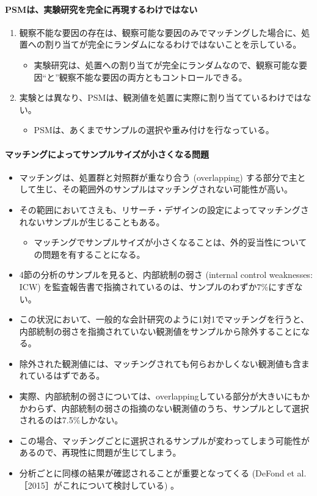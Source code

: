 \paragraph{PSMは、実験研究を完全に再現するわけではない}

\begin{enumerate}
 \item 観察不能な要因の存在は、観察可能な要因のみでマッチングした場合に、処置への割り当てが完全にランダムになるわけではないことを示している。
       \begin{itemize}
        \item 実験研究は、処置への割り当てが完全にランダムなので、観察可能な要因``と''観察不能な要因の両方ともコントロールできる。
       \end{itemize}
 \item 実験とは異なり、PSMは、観測値を処置に実際に割り当てているわけではない。
  \begin{itemize}
   \item PSMは、あくまでサンプルの選択や重み付けを行なっている。
  \end{itemize}
\end{enumerate}

\paragraph{マッチングによってサンプルサイズが小さくなる問題}
\begin{itemize}
 \item マッチングは、処置群と対照群が重なり合う (overlapping) する部分で主として生じ、その範囲外のサンプルはマッチングされない可能性が高い。
 \item その範囲においてさえも、リサーチ・デザインの設定によってマッチングされないサンプルが生じることもある。
 \begin{itemize}
  \item マッチングでサンプルサイズが小さくなることは、外的妥当性についての問題を有することになる。
 \end{itemize}
 \item 4節の分析のサンプルを見ると、内部統制の弱さ (internal control weaknesses: ICW) を監査報告書で指摘されているのは、サンプルのわずか7\%にすぎない。
 \item この状況において、一般的な会計研究のように1対1でマッチングを行うと、内部統制の弱さを指摘されていない観測値をサンプルから除外することになる。
 \item 除外された観測値には、マッチングされても何らおかしくない観測値も含まれているはずである。
 \item 実際、内部統制の弱さについては、overlappingしている部分が大きいにもかかわらず、内部統制の弱さの指摘のない観測値のうち、サンプルとして選択されるのは7.5\%しかない。
 \item この場合、マッチングごとに選択されるサンプルが変わってしまう可能性があるので、再現性に問題が生じてしまう。
 \item 分析ごとに同様の結果が確認されることが重要となってくる (DeFond et al.［2015］がこれについて検討している) 。
\end{itemize}

